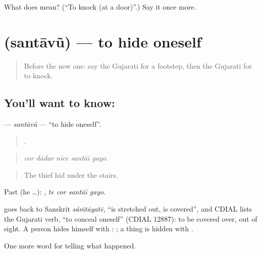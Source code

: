 \begin{tcolorbox}[breakable,colback=teal!4,colframe=teal!35!black,title={Before you move on}]
What does  mean? (\textquotedblleft{}To knock (at a door)\textquotedblright{}.) Say it once more.
\end{tcolorbox}
\section[\texorpdfstring{\gu{સંતાવું} (santāvũ)}{સંતાવું (santāvũ)}]{ (santāvũ) — to hide oneself}

\label{lesson:GU-C287-santavu}



\begin{quote}
Before the new one: say the Gujarati for a footstep, then the Gujarati for to knock.
\end{quote}

\subsection*{You'll want to know: }
\textbf{} — \emph{santāvũ} — \textquotedblleft{}to hide oneself\textquotedblright{}.

\begin{quote}
    .
\end{quote}

\begin{quote}
\emph{cor dādar nīce santāī gayo.}
\end{quote}

\begin{quote}
The thief hid under the stairs.
\end{quote}

Past (he …):    , \emph{te cor santāī gayo}.

\begin{cousinweb}
goes back to Sanskrit \emph{sáṁtāyatē}, \textquotedblleft{}is stretched out, is covered\textquotedblright{}, and CDIAL lists the Gujarati verb, \textquotedblleft{}to conceal oneself\textquotedblright{} (CDIAL 12887): to be covered over, out of sight. A person hides himself with \textbf{}: \textbf{ }; a thing is hidden with \textbf{}.
\end{cousinweb}

\begin{grammarlens}[title={What you've built}]
One more word for telling what happened.
\end{grammarlens}

